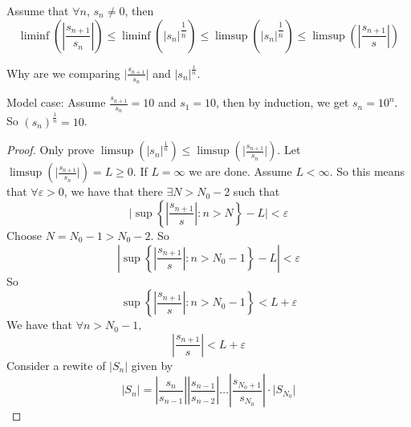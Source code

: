 \documentclass{report}
\begin{document}
\begin{theorem}{12.2}
    Assume that $\forall n$, $s_{n} \neq 0$, then
        \begin{equation*}
            \liminf(\left\lvert \dfrac{s_{n + 1}}{s_{n}} \right\rvert) \leq \liminf (\lvert s_{n} \rvert^{\dfrac{1}{n}}) \leq \limsup(\lvert s_{n} \rvert^{\dfrac{1}{n}}) \leq \limsup(\left\lvert \dfrac{s_{n + 1}}{s} \right\rvert)
        \end{equation*}
\end{theorem}

Why are we comparing $\lvert \frac{s_{n + 1}}{s_{n}} \rvert$ and $\lvert s_{n} \rvert^{\frac{1}{n}}$.

Model case: Assume $\frac{s_{n + 1}}{s_{n}} = 10$ and $s_{1} = 10$, then by induction, we get $s_{n} = 10^{n}$. So $(s_{n})^{\frac{1}{n}} = 10$.
    \begin{proof}
        Only prove $\limsup(\lvert s_{n} \rvert^{\frac{1}{n}}) \leq \limsup(\lvert \frac{s_{n + 1}}{s_{n}} \rvert)$. Let $\limsup(\lvert \frac{s_{n + 1}}{s_{n}} \rvert) = L \geq 0$. If $L = \infty$ we are done. Assume $L < \infty$. So this means that $\forall \varepsilon > 0$, we have that there $\exists N > N_{0} - 2$ such that
            \begin{equation*}
                \lvert \sup \left\{\left\lvert \dfrac{s_{n + 1}}{s} \right\rvert: n > N\right\} - L\rvert < \varepsilon
            \end{equation*}
        Choose $N = N_{0} - 1 > N_{0} - 2$. So 
            \begin{equation*}
                \left\lvert \sup \left\{\left\lvert \dfrac{s_{n + 1}}{s} \right\rvert : n > N_{0} - 1\right\} - L \right\rvert < \varepsilon
            \end{equation*}
        So
            \begin{equation*}
                \sup \left\{\left\lvert \dfrac{s_{n + 1}}{s} \right\rvert : n > N_{0} - 1\right\} <  L + \varepsilon
            \end{equation*}
        We have that $\forall n > N_{0} - 1,$
            \begin{equation*}
                \left\lvert \dfrac{s_{n + 1}}{s} \right\rvert < L + \varepsilon
            \end{equation*}
        Consider a rewite of $\lvert S_{n} \rvert$ given by
            \begin{equation*}
                \lvert S_{n} \rvert = \left\lvert \dfrac{s_{n}}{s_{n - 1}} \right\rvert \left\lvert \dfrac{s_{n - 1}}{s_{n - 2}} \right\rvert \ldots  \left\lvert \dfrac{s_{N_{0} + 1}}{s_{N_{0}}} \right\rvert \cdot \lvert S_{N_{0}} \rvert

\end{equation*}
\end{proof}
\end{document}
